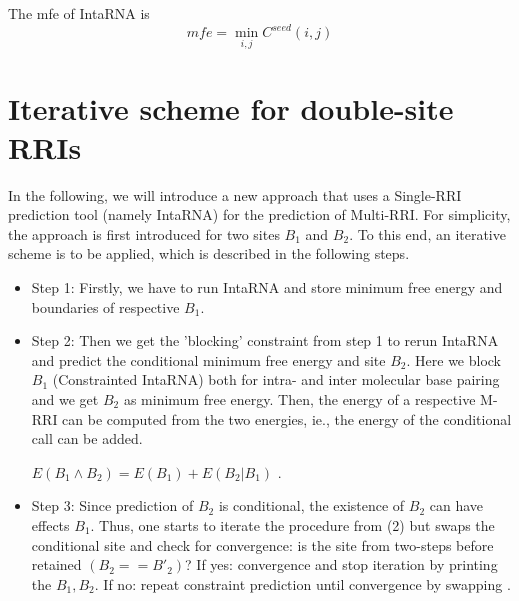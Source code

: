 \documentclass[twoside,a4paper]{report}
\numberwithin{equation}{section}
\begin{document}
	The mfe of IntaRNA is\\
	
		
	\begin{equation*}
	mfe = \min_{i,j} C^{seed}(i,j)
	\end{equation*}
	
	
	\section{Iterative scheme for double-site RRIs}
	 In the following, we will introduce a new approach that uses a Single-RRI prediction tool (namely IntaRNA) for the prediction of Multi-RRI. For simplicity, the approach is first introduced for two sites $B_1$ and $B_2$. To this end, an iterative scheme is to be applied, which is described in the following steps.
	
	 
	 \begin{itemize}
	 	 
	
	 \item Step 1: Firstly, we have to run IntaRNA and store minimum free energy and boundaries of respective $B_1$.
	 \item Step 2: Then we get the 'blocking' constraint from step 1 to rerun IntaRNA and predict the conditional minimum free energy and site $B_2$. Here we block $B_1$ (Constrainted IntaRNA) both for intra- and inter molecular base pairing and we get $B_2$ as minimum free energy. Then, the energy of a respective M-RRI can be computed from the two energies, ie., the energy of the conditional call can be added. \\
	 \begin{center}
	 	 $E(B_1 \land B_2) = E(B_1) + E(B_2 | B_1)$ .
	 \end{center}
	 
	 \item Step 3: Since prediction of $B_2$ is conditional, the existence of $B_2$ can have effects $B_1$. Thus, one starts to iterate the procedure from (2) but swaps the conditional site and check for convergence: is the site from two-steps before retained $(B_2 == B'_2)$? If yes: convergence and stop iteration by printing the  $B_1 , B_2$. If no: repeat constraint prediction until convergence by swapping .
	 
	  \end{itemize}
  
%  	
  
\end{document}
